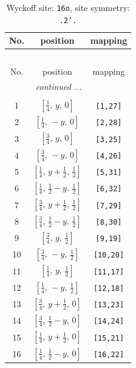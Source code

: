 \documentclass[fleqn,8pt]{jsarticle}
\begin{document}
\renewcommand{\arraystretch}{1.2}
\begin{longtable}{ccc}
\caption{Wyckoff site: {\tt 16o}, site symmetry: {\tt .2'.}}
 \\
 \hline \hline
No. & position & mapping \\ \hline \endfirsthead

\multicolumn{2}{l}{\tablename\ \thetable{}} \\
 \hline \hline
No. & position & mapping \\ \hline \endhead

 \hline \hline
\multicolumn{2}{r}{\footnotesize\it continued ...} \\ \endfoot

 \hline \hline
\multicolumn{2}{r}{} \\ \endlastfoot

1 & $\left[ \frac{1}{4},\, y,\, 0 \right]$ & {\tt [1,27]} \\ \hline
2 & $\left[ \frac{1}{4},\, - y,\, 0 \right]$ & {\tt [2,28]} \\ \hline
3 & $\left[ \frac{3}{4},\, y,\, 0 \right]$ & {\tt [3,25]} \\ \hline
4 & $\left[ \frac{3}{4},\, - y,\, 0 \right]$ & {\tt [4,26]} \\ \hline
5 & $\left[ \frac{1}{4},\, y + \frac{1}{2},\, \frac{1}{2} \right]$ & {\tt [5,31]} \\ \hline
6 & $\left[ \frac{1}{4},\, \frac{1}{2} - y,\, \frac{1}{2} \right]$ & {\tt [6,32]} \\ \hline
7 & $\left[ \frac{3}{4},\, y + \frac{1}{2},\, \frac{1}{2} \right]$ & {\tt [7,29]} \\ \hline
8 & $\left[ \frac{3}{4},\, \frac{1}{2} - y,\, \frac{1}{2} \right]$ & {\tt [8,30]} \\ \hline
9 & $\left[ \frac{3}{4},\, y,\, \frac{1}{2} \right]$ & {\tt [9,19]} \\ \hline
10 & $\left[ \frac{3}{4},\, - y,\, \frac{1}{2} \right]$ & {\tt [10,20]} \\ \hline
11 & $\left[ \frac{1}{4},\, y,\, \frac{1}{2} \right]$ & {\tt [11,17]} \\ \hline
12 & $\left[ \frac{1}{4},\, - y,\, \frac{1}{2} \right]$ & {\tt [12,18]} \\ \hline
13 & $\left[ \frac{3}{4},\, y + \frac{1}{2},\, 0 \right]$ & {\tt [13,23]} \\ \hline
14 & $\left[ \frac{3}{4},\, \frac{1}{2} - y,\, 0 \right]$ & {\tt [14,24]} \\ \hline
15 & $\left[ \frac{1}{4},\, y + \frac{1}{2},\, 0 \right]$ & {\tt [15,21]} \\ \hline
16 & $\left[ \frac{1}{4},\, \frac{1}{2} - y,\, 0 \right]$ & {\tt [16,22]} \\
\end{longtable}
\end{document}
